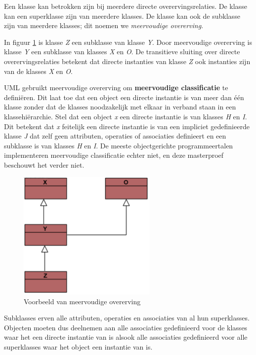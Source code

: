 Een klasse kan betrokken zijn bij meerdere directe overervingsrelaties. De klasse kan een superklasse zijn van meerdere klasses. De klasse kan ook de subklasse zijn van meerdere klasses; dit noemen we \textit{meervoudige overerving}.

In figuur \ref{fig:multi-inheritance} is klasse \textit{Z} een subklasse van klasse \textit{Y}. Door meervoudige overerving is klasse \textit{Y} een subklasse van klasses \textit{X} en \textit{O}. De transitieve sluiting over directe overervingsrelaties betekent dat directe instanties van klasse \textit{Z} ook instanties zijn van de klasses \textit{X} en \textit{O}.

UML gebruikt meervoudige overerving om \textbf{meervoudige classificatie}\cite{RumbaughJames2005Tuml} te defini\"eren. Dit laat toe dat een object een directe instantie is van meer dan \'e\'en klasse zonder dat de klasses noodzakelijk met elkaar in verband staan in een klassehi\"erarchie. Stel dat een object \textit{x} een directe instantie is van klasses \textit{H} en \textit{I}. Dit betekent dat \textit{x} feitelijk een directe instantie is van een impliciet gedefinieerde klasse \textit{J} dat zelf geen attributen, operaties of associaties definieert en een subklasse is van klasses \textit{H} en \textit{I}. De meeste objectgerichte programmeertalen implementeren meervoudige classificatie echter niet, en deze masterproef beschouwt het verder niet.

\begin{figure}
	\centering
	\includegraphics[width=0.6\textwidth]{chap-consistentie/voorbeeld6.png}
	\caption{Voorbeeld van meervoudige overerving}
	\label{fig:multi-inheritance}
\end{figure}

Subklasses erven alle attributen, operaties en associaties van al hun superklasses. Objecten moeten dus deelnemen aan alle associaties gedefinieerd voor de klasses waar het een directe instantie van is alsook alle associaties gedefinieerd voor alle superklasses waar het object een instantie van is.

